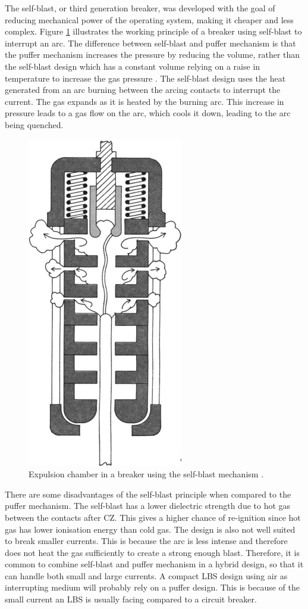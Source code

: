 \documentclass[10pt,a4paper,twoside]{article}
\begin{document}
The self-blast, or third generation breaker, was developed with the goal of reducing mechanical power of the operating system, making it cheaper and less complex. Figure \ref{fig:selfBlast} illustrates the working principle of a breaker using self-blast to interrupt an arc. The difference between self-blast and puffer mechanism is that the puffer mechanism increases the pressure by reducing the volume, rather than the self-blast design which has a constant volume relying on a raise in temperature to increase the gas pressure \cite{bib:CBAC}. The self-blast design uses the heat generated from an arc burning between the arcing contacts to interrupt the current. The gas expands as it is heated by the burning arc. This increase in pressure leads to a gas flow on the arc, which cools it down, leading to the arc being quenched.

\begin{figure} [H]
\centering
\includegraphics[scale=0.36]{Bilder/Theory/selfBlast.png}
\caption{Expulsion chamber in a breaker using the self-blast mechanism \cite{bib:CBAC}.} \label{fig:selfBlast}
\end{figure}

There are some disadvantages of the self-blast principle when compared to the puffer mechanism. The self-blast has a lower dielectric strength due to hot gas between the contacts after CZ. This gives a higher chance of re-ignition since hot gas has lower ionisation energy than cold gas. The design is also not well suited to break smaller currents. This is because the arc is less intense and therefore does not heat the gas sufficiently to create a strong enough blast. Therefore, it is common to combine self-blast and puffer mechanism in a hybrid design, so that it can handle both small and large currents. A compact LBS design using air as interrupting medium will probably rely on a puffer design. This is because of the small current an LBS is usually facing compared to a circuit breaker.
\end{document}
